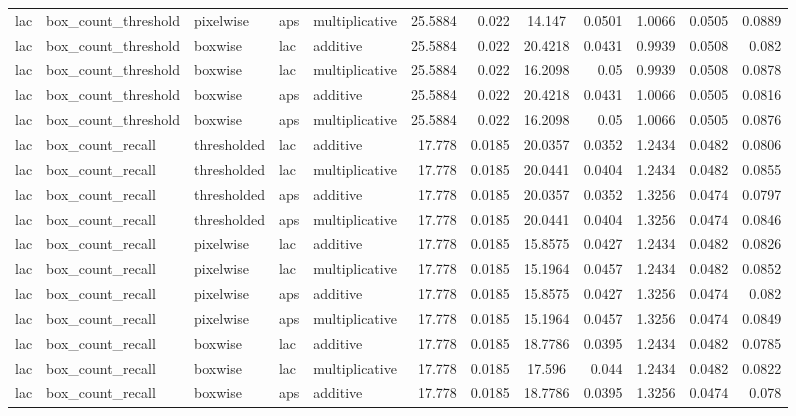 \begin{table*}[htbp]
\begin{tabular}{@{}lllll rrcrrcr@{}}
lac & box\_count\_threshold & pixelwise & aps & multiplicative & 25.5884 & 0.022 & 14.147 & 0.0501 & 1.0066 & 0.0505 & 0.0889 \\
lac & box\_count\_threshold & boxwise & lac & additive & 25.5884 & 0.022 & 20.4218 & 0.0431 & 0.9939 & 0.0508 & 0.082 \\
lac & box\_count\_threshold & boxwise & lac & multiplicative & 25.5884 & 0.022 & 16.2098 & 0.05 & 0.9939 & 0.0508 & 0.0878 \\
lac & box\_count\_threshold & boxwise & aps & additive & 25.5884 & 0.022 & 20.4218 & 0.0431 & 1.0066 & 0.0505 & 0.0816 \\
lac & box\_count\_threshold & boxwise & aps & multiplicative & 25.5884 & 0.022 & 16.2098 & 0.05 & 1.0066 & 0.0505 & 0.0876 \\
lac & box\_count\_recall & thresholded & lac & additive & 17.778 & 0.0185 & 20.0357 & 0.0352 & 1.2434 & 0.0482 & 0.0806 \\
lac & box\_count\_recall & thresholded & lac & multiplicative & 17.778 & 0.0185 & 20.0441 & 0.0404 & 1.2434 & 0.0482 & 0.0855 \\
lac & box\_count\_recall & thresholded & aps & additive & 17.778 & 0.0185 & 20.0357 & 0.0352 & 1.3256 & 0.0474 & 0.0797 \\
lac & box\_count\_recall & thresholded & aps & multiplicative & 17.778 & 0.0185 & 20.0441 & 0.0404 & 1.3256 & 0.0474 & 0.0846 \\
lac & box\_count\_recall & pixelwise & lac & additive & 17.778 & 0.0185 & 15.8575 & 0.0427 & 1.2434 & 0.0482 & 0.0826 \\
lac & box\_count\_recall & pixelwise & lac & multiplicative & 17.778 & 0.0185 & 15.1964 & 0.0457 & 1.2434 & 0.0482 & 0.0852 \\
lac & box\_count\_recall & pixelwise & aps & additive & 17.778 & 0.0185 & 15.8575 & 0.0427 & 1.3256 & 0.0474 & 0.082 \\
lac & box\_count\_recall & pixelwise & aps & multiplicative & 17.778 & 0.0185 & 15.1964 & 0.0457 & 1.3256 & 0.0474 & 0.0849 \\
lac & box\_count\_recall & boxwise & lac & additive & 17.778 & 0.0185 & 18.7786 & 0.0395 & 1.2434 & 0.0482 & 0.0785 \\
lac & box\_count\_recall & boxwise & lac & multiplicative & 17.778 & 0.0185 & 17.596 & 0.044 & 1.2434 & 0.0482 & 0.0822 \\
lac & box\_count\_recall & boxwise & aps & additive & 17.778 & 0.0185 & 18.7786 & 0.0395 & 1.3256 & 0.0474 & 0.078 \\

\end{tabular}
\end{table*}
